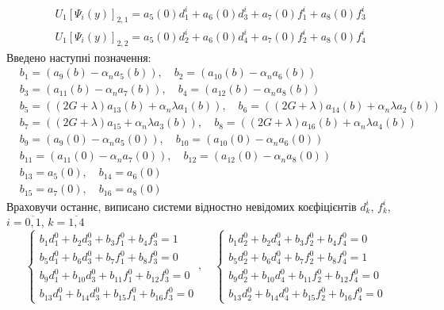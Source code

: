 \begin{align*}
    &U_1\left[ \Psi_i(y) \right]_{2,1} = a_5(0) d_1^i + a_6(0) d_3^i + a_7(0) f_1^i + a_8(0) f_3^i 
\end{align*}
\begin{align*}
    &U_1\left[ \Psi_i(y) \right]_{2,2} = a_5(0) d_2^i + a_6(0) d_4^i + a_7(0) f_2^i + a_8(0) f_4^i 
\end{align*}
Введено наступні позначення:
\begin{align*}
    &b_1 = (a_9(b) - \alpha_n a_5(b)), \quad b_2 = (a_{10}(b) - \alpha_n a_6(b)) \\
    &b_3 = (a_{11}(b) - \alpha_n a_7(b)), \quad b_4 = (a_{12}(b) - \alpha_n a_8(b)) \\
    &b_5 = ((2G + \lambda) a_{13}(b) + \alpha_n \lambda a_1(b)), \quad b_6 = ((2G + \lambda) a_{14}(b) + \alpha_n \lambda a_2(b)) \\
    &b_7 = ((2G + \lambda)a_{15} + \alpha_n \lambda a_3(b)), \quad b_8 = ((2G + \lambda)a_{16}(b) + \alpha_n \lambda a_4(b)) \\
    &b_9 = (a_9(0) - \alpha_n a_5(0)), \quad b_{10} = (a_{10}(0) - \alpha_n a_6(0)) \\
    &b_{11} = (a_{11}(0) - \alpha_n a_7(0)), \quad b_{12} = (a_{12}(0) - \alpha_n a_8(0)) \\
    &b_{13} = a_5(0), \quad b_{14} = a_6(0) \\
    &b_{15} = a_7(0), \quad b_{16} = a_8(0)
\end{align*}
Враховучи останнє, виписано системи відностно невідомих коєфіцієнтів $d_k^i$, $f_k^i$, $i=\overline{0,1}$, $k=\overline{1,4}$
\begin{equation*}
    \begin{cases}
        b_1 d_1^0 + b_2 d_3^0 + b_3 f_1^0 + b_4 f_3^0 = 1 \\
        b_5 d_1^0 + b_6 d_3^0 + b_7 f_1^0 + b_8 f_3^0 = 0 \\
        b_9 d_1^0 + b_{10} d_3^0 + b_{11} f_1^0 + b_{12} f_3^0 = 0 \\
        b_{13} d_1^0 + b_{14} d_3^0 + b_{15} f_1^0 + b_{16} f_3^0 = 0
    \end{cases}, \quad
    \begin{cases}
        b_1 d_2^0 + b_2 d_4^0 + b_3 f_2^0 + b_4 f_4^0 = 0 \\
        b_5 d_2^0 + b_6 d_4^0 + b_7 f_2^0 + b_8 f_4^0 = 1 \\
        b_9 d_2^0 + b_{10} d_4^0 + b_{11} f_2^0 + b_{12} f_4^0 = 0 \\
        b_{13} d_2^0 + b_{14} d_4^0 + b_{15} f_2^0 + b_{16} f_4^0 = 0
    \end{cases}
\end{equation*}
